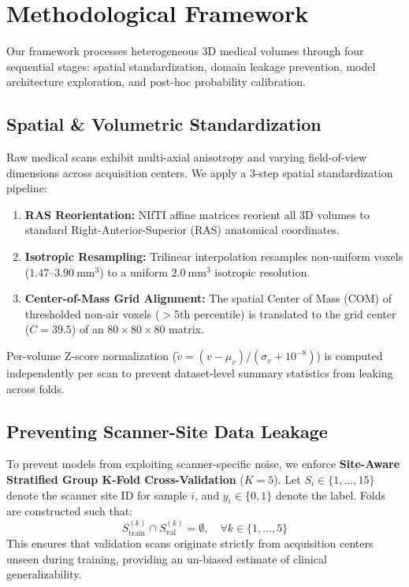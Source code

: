 \section{Methodological Framework}
\label{sec:methodology}

Our framework processes heterogeneous 3D medical volumes through four sequential stages: spatial standardization, domain leakage prevention, model architecture exploration, and post-hoc probability calibration.

\subsection{Spatial \& Volumetric Standardization}
\label{sec:spatial}

Raw medical scans exhibit multi-axial anisotropy and varying field-of-view dimensions across acquisition centers. We apply a 3-step spatial standardization pipeline:
\begin{enumerate}
    \item \textbf{RAS Reorientation:} NIfTI affine matrices reorient all 3D volumes to standard Right-Anterior-Superior (RAS) anatomical coordinates.
    \item \textbf{Isotropic Resampling:} Trilinear interpolation resamples non-uniform voxels ($1.47\text{--}3.90~\text{mm}^3$) to a uniform $2.0~\text{mm}^3$ isotropic resolution.
    \item \textbf{Center-of-Mass Grid Alignment:} The spatial Center of Mass ($\text{COM}$) of thresholded non-air voxels ($>5\text{th}$ percentile) is translated to the grid center ($C = 39.5$) of an $80 \times 80 \times 80$ matrix.
\end{enumerate}
Per-volume Z-score normalization ($\tilde{v} = (v - \mu_v)/(\sigma_v + 10^{-8})$) is computed independently per scan to prevent dataset-level summary statistics from leaking across folds.

\subsection{Preventing Scanner-Site Data Leakage}
\label{sec:leakage}

To prevent models from exploiting scanner-specific noise, we enforce \textbf{Site-Aware Stratified Group K-Fold Cross-Validation} ($K=5$). Let $S_i \in \{1, \dots, 15\}$ denote the scanner site ID for sample $i$, and $y_i \in \{0, 1\}$ denote the label. Folds are constructed such that:
\begin{equation}
S_{\text{train}}^{(k)} \cap S_{\text{val}}^{(k)} = \emptyset, \quad \forall k \in \{1, \dots, 5\}
\end{equation}
This ensures that validation scans originate strictly from acquisition centers unseen during training, providing an un-biased estimate of clinical generalizability.

